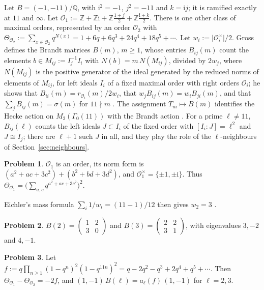 \documentclass[reqno]{amsart}
\theoremstyle{definition}
\newtheorem{problem}{Problem}[section]
\theoremstyle{plain}
\newcommand{\Z}{\mathbb{Z}}
\newcommand{\Q}{\mathbb{Q}}
\newcommand{\ii}{\mathrm{i}}
\newcommand{\Oc}{\mathcal{O}}
\begin{document}
Let \(B = (-1, -11)/\Q\), with \(\ii^2 = -1\), \(j^2 = -11\) and \(k = \ii j\); it is ramified exactly at \(11\) and \(\infty\).  Let \(\Oc_1 := \Z + \Z\ii + \Z\frac{1+j}{2} + \Z\frac{\ii + k}{2}\).  There is one other class of maximal orders, represented by an order \(\Oc_2\) with \(\Theta_{\Oc_2} := \sum_{x \in \Oc_2} q^{N(x)} = 1 + 6q + 6q^3 + 24q^4 + 18q^5 + \cdots\).  Let \(w_i := \lvert\Oc_i^\times\rvert/2\).  Gross defines the Brandt matrices \(B(m)\), \(m \ge 1\), whose entries \(B_{ij}(m)\) count the elements \(b \in M_{ij} := I_j^{-1} I_i\) with \(N(b) = m\, N(M_{ij})\), divided by \(2w_j\), where \(N(M_{ij})\) is the positive generator of the ideal generated by the reduced norms of elements of \(M_{ij}\), for left ideals \(I_i\) of a fixed maximal order with right orders \(\Oc_i\); he shows that \(B_{ii}(m) = r_{\Oc_i}(m)/2w_i\), that \(w_j B_{ij}(m) = w_i B_{ji}(m)\), and that \(\sum_j B_{ij}(m) = \sigma(m)\) for \(11 \nmid m\) \cite[\S\S1--2]{Gr}.  The assignment \(T_m\mapsto B(m)\) identifies the Hecke action on \(M_2(\Gamma_0(11))\) with the Brandt action \cite{Gr}.  For a prime \(\ell \ne 11\), \(B_{ij}(\ell)\) counts the left ideals \(J \subset I_i\) of the fixed order with \([I_i : J] = \ell^2\) and \(J \cong I_j\); there are \(\ell + 1\) such \(J\) in all, and they play the role of the \(\ell\)-neighbours of Section~\ref{sec:neighbours}.

\begin{problem}\label{pr:order}
\(\Oc_1\) is an order, its norm form is \((a^2 + ac + 3c^2) + (b^2 + bd + 3d^2)\), and \(\Oc_1^\times = \{\pm1, \pm\ii\}\).  Thus \(\Theta_{\Oc_1} = \bigl(\sum_{a,c} q^{a^2+ac+3c^2}\bigr)^2\).
\end{problem}

Eichler's mass formula \(\sum_i 1/w_i = (11 - 1)/12\) then gives \(w_2 = 3\) \cite{Gr}.

\begin{problem}\label{pr:brandt}
\(B(2) = \begin{pmatrix} 1 & 2 \\ 3 & 0 \end{pmatrix}\) and \(B(3) = \begin{pmatrix} 2 & 2 \\ 3 & 1 \end{pmatrix}\), with eigenvalues \(3, -2\) and \(4, -1\).
\end{problem}

\begin{problem}\label{pr:basis}
Let \(f := q\prod_{n \ge 1}(1 - q^n)^2(1 - q^{11n})^2 = q - 2q^2 - q^3 + 2q^4 + q^5 + \cdots\).  Then \(\Theta_{\Oc_1} - \Theta_{\Oc_2} = -2f\), and \((1, -1)\,B(\ell) = a_\ell(f)\,(1, -1)\) for \(\ell = 2, 3\).
\end{problem}
\end{document}
